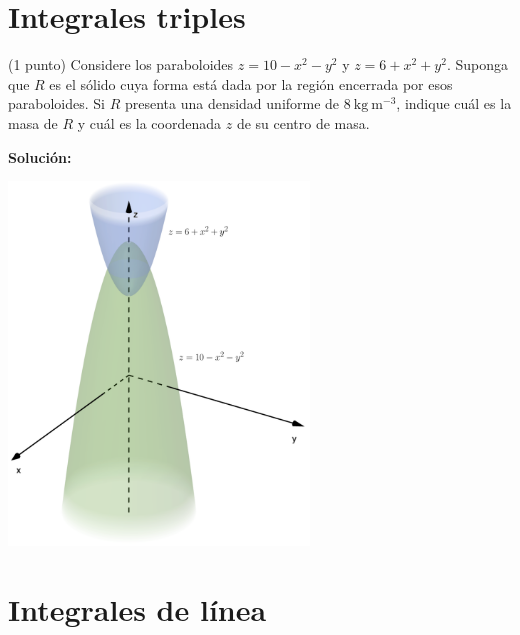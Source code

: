 \documentclass{fmbvecto}
\begin{document}
\section{Integrales triples}

\begin{problema}
    
    (1 punto) Considere los paraboloides \(z = 10 - x^2 - y^2\) y \(z = 6 + x^2 + y^2\). Suponga que \(R\) es el sólido cuya forma está dada por la región encerrada por esos paraboloides. Si \(R\) presenta una densidad uniforme de \(8 \: \text{kg} \: \text{m}^{-3}\), indique cuál es la masa de \(R\) y cuál es la coordenada \(z\) de su centro de masa.


\vspace{1em}
\tcblower
\textbf{Solución:}

\begin{center}
    \includegraphics[width=0.6\textwidth]{interseccion-paraboloides.png}
    \label{fig:interseccion-paraboloides}
\end{center}

\end{problema}


\section{Integrales de línea}
\end{document}
